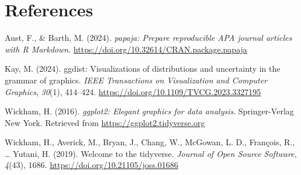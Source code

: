 \documentclass[
  man,floatsintext]{apa6}
\newlength{\cslhangindent}
\newenvironment{CSLReferences}[2] %
 {\begin{list}{}{%
  \setlength{\itemindent}{0pt}
  \setlength{\leftmargin}{0pt}
  \setlength{\parsep}{0pt}
  \ifodd #1
   \setlength{\leftmargin}{\cslhangindent}
   \setlength{\itemindent}{-1\cslhangindent}
  \fi
  \setlength{\itemsep}{#2\baselineskip}}}
 {\end{list}}
\begin{document}
\newpage

\section{References}\label{references}

\label{refs}
\begin{CSLReferences}{1}{0}
Aust, F., \& Barth, M. (2024). \emph{{papaja}: {Prepare} reproducible {APA} journal articles with {R Markdown}}. \url{https://doi.org/10.32614/CRAN.package.papaja}

Kay, M. (2024). {ggdist}: Visualizations of distributions and uncertainty in the grammar of graphics. \emph{IEEE Transactions on Visualization and Computer Graphics}, \emph{30}(1), 414--424. \url{https://doi.org/10.1109/TVCG.2023.3327195}

Wickham, H. (2016). \emph{ggplot2: Elegant graphics for data analysis}. Springer-Verlag New York. Retrieved from \url{https://ggplot2.tidyverse.org}

Wickham, H., Averick, M., Bryan, J., Chang, W., McGowan, L. D., François, R., \ldots{} Yutani, H. (2019). Welcome to the {tidyverse}. \emph{Journal of Open Source Software}, \emph{4}(43), 1686. \url{https://doi.org/10.21105/joss.01686}

\end{CSLReferences}
\end{document}
